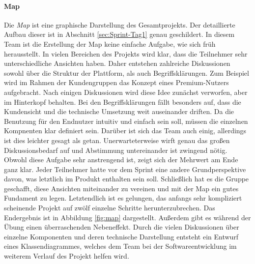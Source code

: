 \paragraph{Map}
Die \textit{Map} ist eine graphische Darstellung des Gesamtprojekts. Der detaillierte Aufbau dieser ist in Abschnitt \ref{sec:Sprint-Tag1} genau geschildert. 
In diesem Team ist die Erstellung der Map keine einfache Aufgabe, wie sich früh herausstellt. In vielen Bereichen des Projekts wird klar, dass die Teilnehmer sehr unterschiedliche Ansichten haben. Daher entstehen zahlreiche Diskussionen sowohl über die Struktur der Plattform, als auch Begriffsklärungen. Zum Beispiel wird im Rahmen der Kundengruppen das Konzept eines Premium-Nutzers aufgebracht. Nach einigen Diskussionen wird diese Idee zunächst verworfen, aber im Hinterkopf behalten. Bei den Begriffsklärungen fällt besonders auf, dass die Kundensicht und die technische Umsetzung weit auseinander driften. Da die Benutzung für den Endnutzer intuitiv und einfach sein soll, müssen die einzelnen Kompnenten klar definiert sein. Darüber ist sich das Team auch einig, allerdings ist dies leichter gesagt als getan. Unerwarteterweise wirft genau das großen Diskussionsbedarf auf und Abstimmung untereinander ist zwingend nötig. Obwohl diese Aufgabe sehr anstrengend ist, zeigt sich der Mehrwert am Ende ganz klar. Jeder Teilnehmer hatte vor dem Sprint eine andere Grundperspektive davon, was letztlich im Produkt enthalten sein soll. Schließlich hat es die Gruppe geschafft, diese Ansichten miteinander zu vereinen und mit der Map ein gutes Fundament zu legen. Letztendlich ist es gelungen, das anfangs sehr kompliziert scheinende Projekt auf zwölf einzelne Schritte herunterzubrechen. Das Endergebnis ist in Abbildung \ref{fig:map} dargestellt. Außerdem gibt es während der Übung einen überraschenden Nebeneffekt. Durch die vielen Diskussionen über einzelne Komponenten und deren technische Darstellung entsteht ein Entwurf eines Klassendiagrammes, welches dem Team bei der Softwareentwicklung im weiterem Verlauf des Projekt helfen wird.

